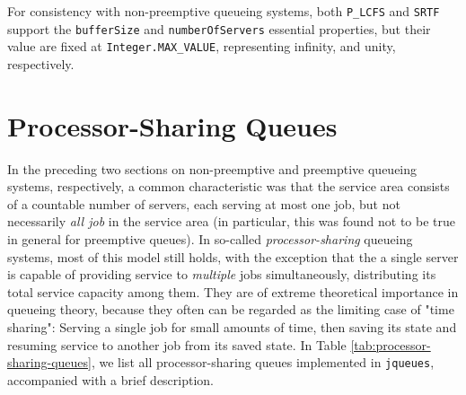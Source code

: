 For consistency with
  non-preemptive queueing systems,
  both \lstinline|P_LCFS| and \lstinline|SRTF|
  support the
  \lstinline|bufferSize|
  and \lstinline|numberOfServers|
  essential properties,
  but their value are fixed
  at
  \lstinline|Integer.MAX_VALUE|,
  representing infinity,
  and unity,
  respectively.
  
\section{Processor-Sharing Queues}

In the preceding two sections
  on non-preemptive and preemptive
  queueing systems, respectively,
  a common characteristic was that
  the service area consists of
  a countable number of servers,
  each serving at most one job,
  but not necessarily {\em all job\/}
  in the service area (in particular,
  this was found not to be true in general
  for preemptive queues).
In so-called {\em processor-sharing\/}
  queueing systems,
  most of this model still holds,
  with the exception that
  the a single server is capable of providing
  service to {\em multiple\/} jobs simultaneously,
  distributing its total service capacity
  among them.
They are of extreme theoretical importance in queueing theory,
  because they often can be regarded as the limiting case
  of "time sharing": Serving a single job for small amounts of time,
  then saving its state
  and resuming service to another job from its saved state.
In Table \ref{tab:processor-sharing-queues},
  we list all processor-sharing queues implemented in
  \lstinline|jqueues|, accompanied with a brief
  description.
  
